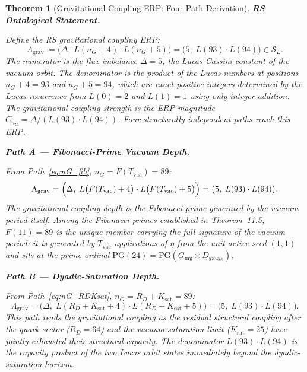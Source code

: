 \documentclass[11pt, letterpaper]{article}
\theoremstyle{definition}
\theoremstyle{plain}
\newtheorem{theorem}{Theorem}[section]
\begin{document}
\begin{theorem}[Gravitational Coupling ERP: Four-Path Derivation]

\textbf{RS Ontological Statement.}

Define the RS gravitational coupling ERP:
\begin{equation}
    \Lambda_\mathrm{grav} := \bigl(\Delta,\; L(n_G + 4) \cdot L(n_G + 5)\bigr)
                            = \bigl(5,\; L(93) \cdot L(94)\bigr) \in \mathcal{S}_L.
\end{equation}
The numerator is the flux imbalance $\Delta = 5$, the Lucas-Cassini constant of the vacuum
orbit. The denominator is the product of the Lucas numbers at positions $n_G + 4 = 93$
and $n_G + 5 = 94$, which are exact positive integers determined by the Lucas recurrence
from $L(0) = 2$ and $L(1) = 1$ using only integer addition. The gravitational coupling
strength is the ERP-magnitude $C_{n_G} = \Delta / (L(93) \cdot L(94))$. Four
structurally independent paths reach this ERP.

\medskip
\noindent\textbf{Path A — Fibonacci-Prime Vacuum Depth.}

From Path~\eqref{eq:nG_fib}, $n_G = F(T_\mathrm{vac}) = 89$:
\begin{equation}
    \Lambda_\mathrm{grav}
    = \Bigl(\Delta,\; L\bigl(F(T_\mathrm{vac}) + 4\bigr) \cdot L\bigl(F(T_\mathrm{vac}) + 5\bigr)\Bigr)
    = \bigl(5,\; L(93) \cdot L(94)\bigr).
\end{equation}
The gravitational coupling depth is the Fibonacci prime generated by the vacuum period
itself. Among the Fibonacci primes established in Theorem~11.5, $F(11) = 89$ is the
unique member carrying the full signature of the vacuum period: it is generated by
$T_\mathrm{vac}$ applications of $\eta$ from the unit active seed $(1,1)$ and sits at the prime
ordinal $\mathrm{PG}(24) = \mathrm{PG}(G_\mathrm{mg} \times D_\mathrm{gauge})$.

\medskip
\noindent\textbf{Path B — Dyadic-Saturation Depth.}

From Path~\eqref{eq:nG_RDKsat}, $n_G = R_D + K_\mathrm{sat} = 89$:
\begin{equation}
    \Lambda_\mathrm{grav}
    = \bigl(\Delta,\; L(R_D + K_\mathrm{sat} + 4) \cdot L(R_D + K_\mathrm{sat} + 5)\bigr)
    = \bigl(5,\; L(93) \cdot L(94)\bigr).
\end{equation}
This path reads the gravitational coupling as the residual structural coupling after
the quark sector ($R_D = 64$) and the vacuum saturation limit ($K_\mathrm{sat} = 25$)
have jointly exhausted their structural capacity. The denominator $L(93) \cdot L(94)$
is the capacity product of the two Lucas orbit states immediately beyond the
dyadic-saturation horizon.


\end{theorem}
\end{document}
